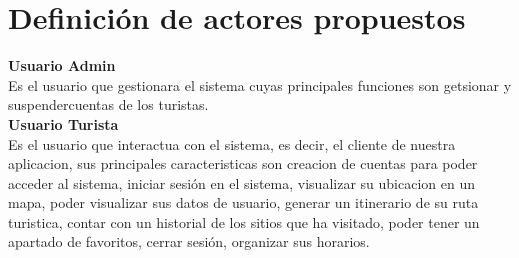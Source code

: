 \documentclass{article}
\begin{document}
\newpage




    
\section{\textcolor{azul}{Definición de actores propuestos}}
\textbf{Usuario Admin}\\
Es el usuario que gestionara  el sistema cuyas principales funciones son getsionar y suspendercuentas de los turistas.\\
\vspace{.5cm}
\textbf{Usuario Turista}\\
Es el usuario que interactua con el sistema, es decir, el cliente de nuestra aplicacion, sus principales caracteristicas son creacion de cuentas para poder acceder al sistema, iniciar sesión en el sistema, visualizar su ubicacion en un mapa, poder visualizar sus datos de usuario, generar un itinerario de su ruta turistica, contar con un historial de los sitios que ha visitado, poder tener un apartado de favoritos, cerrar sesión, organizar sus horarios. 






\end{document}
